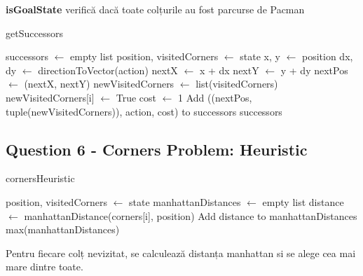 \par \textbf{isGoalState} verifică dacă toate colțurile au fost parcurse de Pacman

\begin{algorithm}
\caption{getSuccessors}
\begin{algorithmic}[1]
    \State successors $\gets$ empty list
    \State position, visitedCorners $\gets$ state
    \State x, y $\gets$ position
        \State dx, dy $\gets$ directionToVector(action)
        \State nextX $\gets$ x + dx
        \State nextY $\gets$ y + dy
        \State nextPos $\gets$ (nextX, nextY)
            \State newVisitedCorners $\gets$ list(visitedCorners)
                    \State newVisitedCorners[i] $\gets$ True
                \EndIf
            \EndFor
            \State cost $\gets$ 1
            \State Add ((nextPos, tuple(newVisitedCorners)), action, cost) to successors
        \EndIf
    \EndFor
    \State \Return successors
\EndFunction
\end{algorithmic}
\end{algorithm}

\pagebreak

\subsection {Question 6 - Corners Problem: Heuristic}

\begin{algorithm}
\caption{cornersHeuristic}
\begin{algorithmic}[1]
    \State position, visitedCorners $\gets$ state
        \State {}
    \EndIf
    \State manhattanDistances $\gets$ empty list
            \State distance $\gets$ manhattanDistance(corners[i], position)
            \State Add distance to manhattanDistances
        \EndIf
    \EndFor
    \State \Return max(manhattanDistances)
\EndFunction
\end{algorithmic}
\end{algorithm}

\par Pentru fiecare colț nevizitat, se calculează distanța manhattan si se alege cea mai mare dintre toate.

